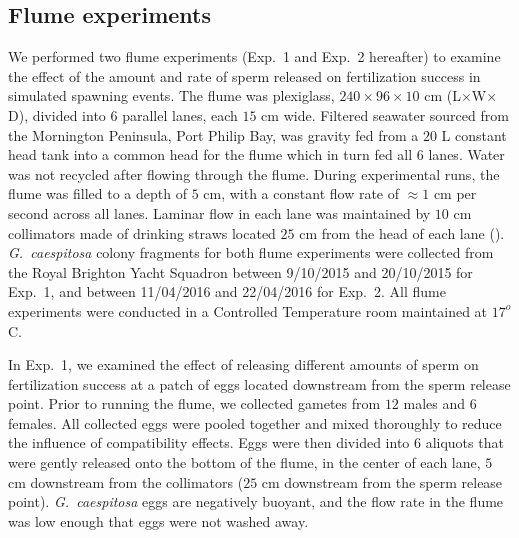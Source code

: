 \documentclass{article}
\begin{document}
	\subsection*{Flume experiments}
	We performed two flume experiments (Exp.~1 and Exp.~2 hereafter) to examine the effect of the amount and rate of sperm released on fertilization success in simulated spawning events. The flume was plexiglass, $240 \times 96 \times 10$ cm (L$\times$W$\times$D), divided into $6$ parallel lanes, each $15$ cm wide. Filtered seawater sourced from the Mornington Peninsula, Port Philip Bay, was gravity fed from a $20$ L constant head tank into a common head for the flume which in turn fed all $6$ lanes. Water was not recycled after flowing through the flume. During experimental runs, the flume was filled to a depth of $5$ cm, with a constant flow rate of $\approx 1$ cm per second across all lanes. Laminar flow in each lane was maintained by $10$ cm collimators made of drinking straws located $25$ cm from the head of each lane (\citealt{YundMeidel2003}). \textit{G.~caespitosa} colony fragments for both flume experiments were collected from the Royal Brighton Yacht Squadron between 9/10/2015 and 20/10/2015 for Exp.~1, and between 11/04/2016 and 22/04/2016 for Exp.~2. All flume experiments were conducted in a Controlled Temperature room maintained at $17^o$ C.

	In Exp.~1, we examined the effect of releasing different amounts of sperm on fertilization success at a patch of eggs located downstream from the sperm release point. Prior to running the flume, we collected gametes from $12$ males and $6$ females. All collected eggs were pooled together and mixed thoroughly to reduce the influence of compatibility effects. Eggs were then divided into $6$ aliquots that were gently released onto the bottom of the flume, in the center of each lane, $5$ cm downstream from the collimators ($25$ cm downstream from the sperm release point). \textit{G.~caespitosa} eggs are negatively buoyant, and the flow rate in the flume was low enough that eggs were not washed away. 
\end{document}
